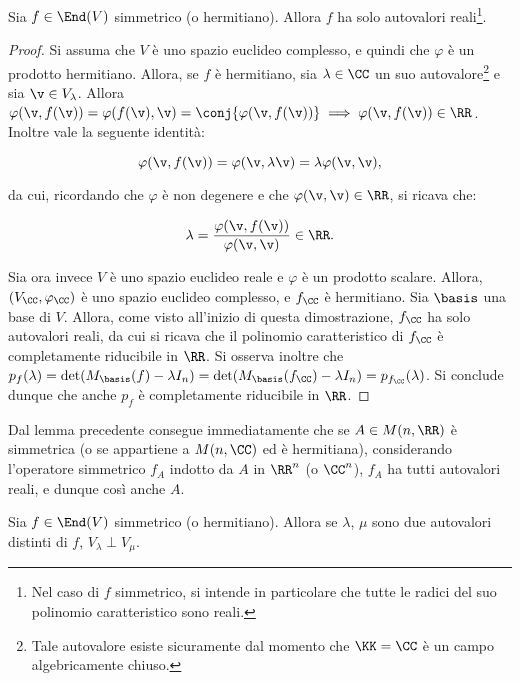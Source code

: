 \documentclass[11pt]{article}
\begin{document}
	\begin{lemma}
		Sia $f \in \End(V)$ simmetrico (o hermitiano). Allora $f$ ha solo autovalori reali\footnote{Nel caso
		di $f$ simmetrico, si intende in particolare che tutte le radici del suo polinomio caratteristico
		sono reali.}.
	\end{lemma}
	
	\begin{proof}
		Si assuma che $V$ è uno spazio euclideo complesso, e quindi che $\varphi$ è un prodotto hermitiano. Allora,
		se $f$ è hermitiano, sia $\lambda \in \CC$ un suo autovalore\footnote{Tale autovalore esiste sicuramente dal momento
		che $\KK = \CC$ è un campo algebricamente chiuso.} e sia $\v \in V_\lambda$. Allora $\varphi(\v, f(\v)) =
		\varphi(f(\v), \v) = \conj{\varphi(\v, f(\v))} \implies \varphi(\v, f(\v)) \in \RR$. Inoltre vale
		la seguente identità:
		
		\[ \varphi(\v, f(\v)) = \varphi(\v, \lambda \v) = \lambda \varphi(\v, \v), \]
		
		da cui, ricordando che $\varphi$ è non degenere e che $\varphi(\v, \v) \in \RR$, si ricava che:
		
		\[ \lambda = \frac{\varphi(\v, f(\v))}{\varphi(\v, \v)} \in \RR. \]
		
		\vskip 0.05in
		
		Sia ora invece $V$ è uno spazio euclideo reale e $\varphi$ è un prodotto scalare. Allora, $(V_\CC, \varphi_\CC)$
		è uno spazio euclideo complesso, e $f_\CC$ è hermitiano. Sia $\basis$ una base di $V$. Allora, come visto all'inizio di questa
		dimostrazione, $f_\CC$ ha solo autovalori reali, da cui si ricava che il polinomio caratteristico
		di $f_\CC$ è completamente riducibile in $\RR$. Si osserva inoltre che $p_f(\lambda) = \det(M_\basis(f) - \lambda I_n) = \det(M_\basis(f_\CC) - \lambda I_n) = p_{f_\CC}(\lambda)$. Si conclude dunque che
		anche $p_f$ è completamente riducibile in $\RR$.
	\end{proof}
	
	\begin{remark}
		Dal lemma precedente consegue immediatamente che se $A \in M(n, \RR)$ è simmetrica (o se appartiene a
		$M(n, \CC)$ ed è hermitiana), considerando l'operatore simmetrico $f_A$ indotto da $A$ in $\RR^n$ (o $\CC^n$),
		$f_A$ ha tutti autovalori reali, e dunque così anche $A$. 
	\end{remark}
	
	\begin{lemma}
		Sia $f \in \End(V)$ simmetrico (o hermitiano). Allora se $\lambda$, $\mu$ sono due autovalori distinti
		di $f$, $V_\lambda \perp V_\mu$.
	\end{lemma}
	
\end{document}

